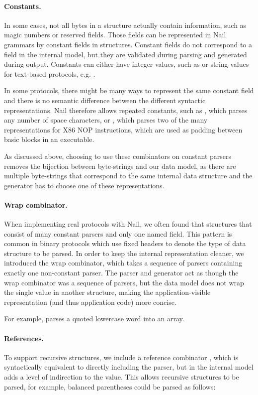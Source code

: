 \paragraph{Constants.}
In some cases, not all bytes in a structure actually contain information, such as magic numbers or
reserved fields. Those fields can be represented in Nail grammars by constant fields in structures.
Constant fields do not correspond to a field in the internal model, but they are validated during
parsing and generated during output.  Constants can either have integer values, such as
 or string values for text-based protocols, e.g. .

In some protocols, there might be many ways to represent the same constant field
and there is no semantic difference between the different syntactic representations.
Nail therefore allows repeated constants, such as , which parses any number of space characters, or
, which parses two of the many representations for X86
NOP instructions, which are used as padding between basic blocks in an executable. 

As discussed above, choosing to use these combinators on constant parsers
removes the bijection between byte-strings and our data model, as there are
multiple byte-strings that correspond to the same internal data structure and
the generator has to choose one of these representations.
\paragraph{Wrap combinator.} 
When implementing real protocols with Nail, we often found that
structures that consist of many constant parsers and only one named field. This pattern is
common in binary protocols which use fixed headers to denote the type of data
structure to be parsed.  In order to keep the internal representation cleaner,
we introduced the wrap combinator, which takes a sequence of parsers containing
exactly one non-constant parser. The parser and generator act as though the wrap
combinator was a sequence of parsers, but the data model does not wrap the
single value in another structure, making the application-visible representation
(and thus application code) more concise.


For example,  parses a quoted
lowercase word into an array.

\paragraph{References.}
To support recursive structures, we include a reference combinator \cc{*}, which is
syntactically equivalent to directly including the parser, but in the internal model adds a level of
indirection to the value. This allows recursive structures to be parsed, for example, balanced
parentheses could be parsed as follows: 

